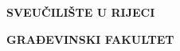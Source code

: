 \thispagestyle{empty}

\vspace{\baselineskip}
\begin{Center}
{\fontsize{14pt}{16.8pt}\selectfont \textbf{SVEUČILIŠTE U RIJECI}\par}
\end{Center}\par

\begin{Center}
{\fontsize{14pt}{16.8pt}\selectfont \textbf{GRAĐEVINSKI FAKULTET}\par}
\end{Center}\par


\vspace{\baselineskip}
\begin{Center}
{\fontsize{14pt}{16.8pt}\selectfont \textbf{{\studij}}\par}
\end{Center}\par

\begin{Center}
{\fontsize{14pt}{16.8pt}\selectfont \textbf{{\smjer}}\par}
\end{Center}\par

\begin{Center}
{\fontsize{14pt}{16.8pt}\selectfont \textbf{ {\kolegij} }\par}
\end{Center}\par


%
%
%
%
%
%
%
%
%
%
%

\vskip 144pt

\begin{Center}
{\fontsize{14pt}{16.8pt}\selectfont \textbf{{\autor}}\par}
\end{Center}\par

